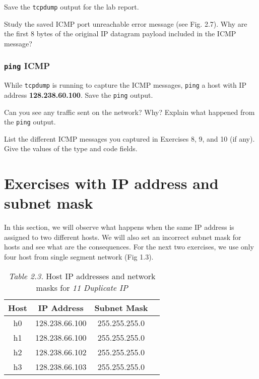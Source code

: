 \documentclass{../UTNetLab}
\begin{document}
    Save the \lstinline{tcpdump} output for the lab report.

    \begin{report}
    \item Study the saved ICMP port unreachable error message (see Fig. 2.7).
    Why are the first 8 bytes of the original IP datagram payload included in the ICMP message?
    \end{report}

\section{\texttt{ping} ICMP}
    While \lstinline{tcpdump} is running to capture the ICMP messages, \lstinline{ping} a host with IP address \textbf{128.238.60.100}. Save the \lstinline{ping} output.
    
    \begin{report}
    \item Can you see any traffic sent on the network? Why? Explain what happened from the \lstinline{ping} output.

    \item List the different ICMP messages you captured in Exercises 8, 9, and 10 (if any). Give the values of the type and code fields.
    \end{report}

\part{Exercises with IP address and subnet mask}
    In this section, we will observe what happens when the same IP address is assigned to two different hosts.
    We will also set an incorrect subnet mask for hosts and see what are the consequences.
    For the next two exercises, we use only four host from single segment network (Fig 1.3).

    \begin{table}[H]
        \caption{\textit{Table 2.3.} Host IP addresses and network masks for \textit{11 Duplicate IP}}
        \centering
        \begin{tabular}{ c c c c }
            \hline \hline
            Host & IP Address & Subnet Mask \\
            \hline 
            h0 & 128.238.66.100 & 255.255.255.0 \\
            h1 & 128.238.66.100 & 255.255.255.0 \\
            h2 & 128.238.66.102 & 255.255.255.0 \\
            h3 & 128.238.66.103 & 255.255.255.0 \\
            \hline \hline
            \end{tabular}
    \end{table}
\end{document}
